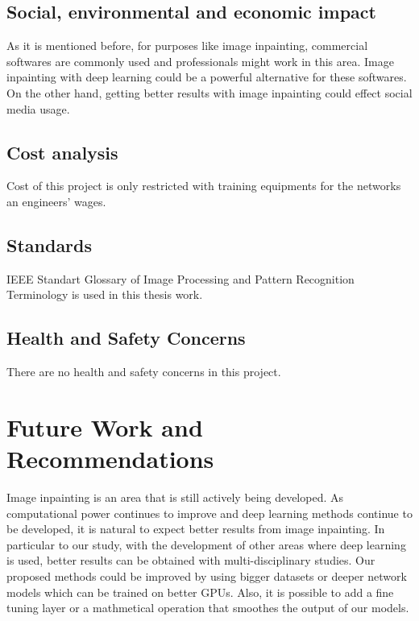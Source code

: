 \subsection{Social, environmental and economic impact}

As it is mentioned before, for purposes like image inpainting, commercial softwares are commonly used and professionals might work in this area. Image inpainting with deep learning could be a powerful alternative for these softwares. On the other hand, getting better results with image inpainting could effect social media usage. 

\subsection{Cost analysis}

Cost of this project is only restricted with training equipments for the networks an engineers' wages.

\subsection{Standards}

IEEE Standart Glossary of Image Processing and Pattern Recognition Terminology is used in this thesis work.

\subsection{Health and Safety Concerns}

There are no health and safety concerns in this project.

\section{Future Work and Recommendations}

Image inpainting is an area that is still actively being developed. As computational power continues to improve and deep learning methods continue to be developed, it is natural to expect better results from image inpainting. In particular to our study, with the development of other areas where deep learning is used, better results can be obtained with multi-disciplinary studies. Our proposed methods could be improved by using bigger datasets or deeper network models which can be trained on better GPUs. Also, it is possible to add a fine tuning layer or a mathmetical operation that smoothes the output of our models.